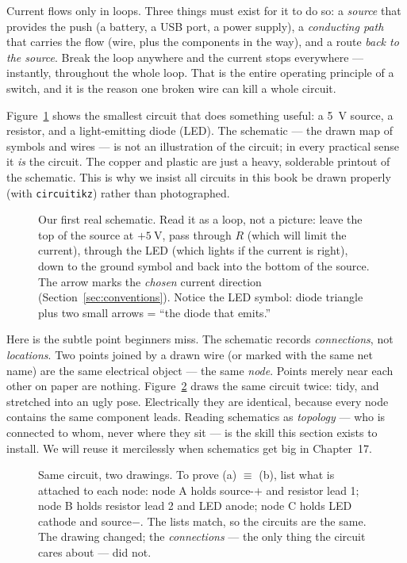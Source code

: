 Current flows only in loops. Three things must exist for it to do so: a
\emph{source} that provides the push (a battery, a USB port, a power supply), a
\emph{conducting path} that carries the flow (wire, plus the components in the
way), and a route \emph{back to the source}. Break
the loop anywhere and the current stops everywhere — instantly, throughout the
whole loop. That is the entire operating principle of a switch, and it is the
reason one broken wire can kill a whole circuit.

Figure~\ref{fig:first} shows the smallest circuit that does something useful:
a \qty{5}{\volt} source, a resistor, and a light-emitting diode (LED). The
schematic — the drawn map of symbols and wires — is not
an illustration of the circuit; in every practical sense it \emph{is} the
circuit. The copper and plastic are just a heavy, solderable printout of the
schematic. This is why we insist all circuits in this book be drawn properly
(with \texttt{circuitikz}) rather than photographed.

\begin{figure}[htbp]
\centering

\caption{Our first real schematic. Read it as a loop, not a picture: leave the
top of the source at $+\qty{5}{\volt}$, pass through $R$ (which will limit the
current), through the LED (which lights if the current is right), down to the
ground symbol and back into the bottom of the source. The arrow marks the
\emph{chosen} current direction (Section~\ref{sec:conventions}). Notice the LED
symbol: diode triangle plus two small arrows = ``the diode that emits.''}
\label{fig:first}
\end{figure}

Here is the subtle point beginners miss. The schematic records
\emph{connections}, not \emph{locations}. Two points joined by a drawn wire (or
marked with the same net name) are the same electrical object — the same
\emph{node}. Points merely near each other on paper are
nothing. Figure~\ref{fig:topology} draws the same circuit twice: tidy, and
stretched into an ugly pose. Electrically they are identical, because every
node contains the same component leads. Reading schematics as
\emph{topology} — who is connected to whom, never where they
sit — is the skill this section exists to install. We will reuse it
mercilessly when schematics get big in Chapter~17.

\begin{figure}[htbp]
\centering

\caption{Same circuit, two drawings. To prove (a) $\equiv$ (b), list what is
attached to each node: node A holds source-$+$ and resistor lead 1; node B holds
resistor lead 2 and LED anode; node C holds LED cathode and source$-$. The lists
match, so the circuits are the same. The drawing changed; the
\emph{connections} — the only thing the circuit cares about — did not.}
\label{fig:topology}
\end{figure}


